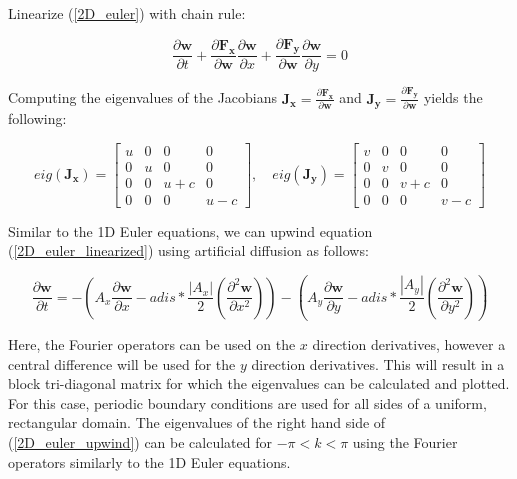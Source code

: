 \documentclass[10pt]{article}
\begin{document}
	Linearize (\ref{2D_euler}) with chain rule:
	
	\begin{equation} \label{2D_euler_linearized}
		\frac{\partial \mathbf{w}}{\partial t} + \frac{\partial \mathbf{F_x}}{\partial \mathbf{w}} \frac{\partial \mathbf{w}}{\partial x} + \frac{\partial \mathbf{F_y}}{\partial \mathbf{w}} \frac{\partial \mathbf{w}}{\partial y}= 0
	\end{equation}
	
	Computing the eigenvalues of the Jacobians $\mathbf{J_x} = \frac{\partial \mathbf{F_x}}{\partial \mathbf{w}}$ and $\mathbf{J_y} = \frac{\partial \mathbf{F_y}}{\partial \mathbf{w}}$ yields the following:
	
		$$eig(\mathbf{J_x}) = 
		\begin{bmatrix}
			u & 0 & 0 & 0\\
			0 & u & 0 & 0\\
			0 & 0 & u+c & 0 \\
			0 & 0 &0 & u-c
		\end{bmatrix}, \quad
		eig(\mathbf{J_y}) = 
		\begin{bmatrix}
			v & 0 & 0 & 0\\
			0 & v & 0 & 0\\
			0 & 0 & v+c & 0 \\
			0 & 0 &0 & v-c
		\end{bmatrix}$$
	
	Similar to the 1D Euler equations, we can upwind equation (\ref{2D_euler_linearized}) using artificial diffusion as follows:
	
	\begin{equation} \label{2D_euler_upwind}
		\frac{\partial \mathbf{w}}{\partial t} = - \left( A_x \frac{\partial \mathbf{w}}{\partial x} - adis * \frac{|A_x|}{2} \left( \frac{\partial^2 \mathbf{w}}{\partial x^2} \right) \right) - \left( A_y \frac{\partial \mathbf{w}}{\partial y} - adis * \frac{|A_y|}{2} \left( \frac{\partial^2 \mathbf{w}}{\partial y^2} \right) \right)
	\end{equation}
	
	Here, the Fourier operators can be used on the $x$ direction derivatives, however a central difference will be used for the $y$ direction derivatives. This will result in a block tri-diagonal matrix for which the eigenvalues can be calculated and plotted. For this case, periodic boundary conditions are used for all sides of a uniform, rectangular domain. The eigenvalues of the right hand side of (\ref{2D_euler_upwind}) can be calculated for $-\pi<k<\pi$ using the Fourier operators similarly to the 1D Euler equations. 
	
\end{document}
